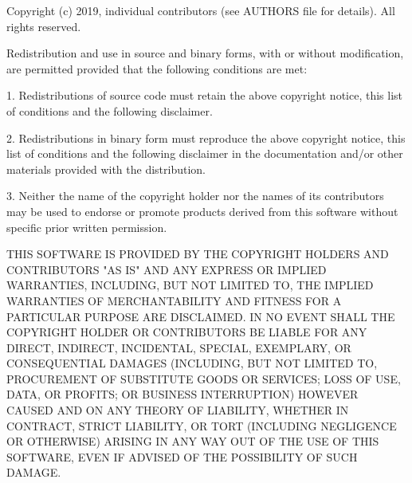\begin{Notice}
Copyright (c) 2019, individual contributors (see AUTHORS file for 
details). All rights reserved.

Redistribution and use in source and binary forms, with or without
modification, are permitted provided that the following conditions
are met:

1. Redistributions of source code must retain the above copyright
notice, this list of conditions and the following disclaimer.

2. Redistributions in binary form must reproduce the above copyright
notice, this list of conditions and the following disclaimer in the
documentation and/or other materials provided with the distribution.

3. Neither the name of the copyright holder nor the names of its
contributors may be used to endorse or promote products derived from
this software without specific prior written permission.

THIS SOFTWARE IS PROVIDED BY THE COPYRIGHT HOLDERS AND CONTRIBUTORS
"AS IS" AND ANY EXPRESS OR IMPLIED WARRANTIES, INCLUDING, BUT NOT
LIMITED TO, THE IMPLIED WARRANTIES OF MERCHANTABILITY AND FITNESS
FOR A PARTICULAR PURPOSE ARE DISCLAIMED. IN NO EVENT SHALL THE
COPYRIGHT HOLDER OR CONTRIBUTORS BE LIABLE FOR ANY DIRECT, INDIRECT,
INCIDENTAL, SPECIAL, EXEMPLARY, OR CONSEQUENTIAL DAMAGES (INCLUDING,
BUT NOT LIMITED TO, PROCUREMENT OF SUBSTITUTE GOODS OR SERVICES;
LOSS OF USE, DATA, OR PROFITS; OR BUSINESS INTERRUPTION) HOWEVER
CAUSED AND ON ANY THEORY OF LIABILITY, WHETHER IN CONTRACT, STRICT
LIABILITY, OR TORT (INCLUDING NEGLIGENCE OR OTHERWISE) ARISING IN
ANY WAY OUT OF THE USE OF THIS SOFTWARE, EVEN IF ADVISED OF THE
POSSIBILITY OF SUCH DAMAGE.
\end{Notice}